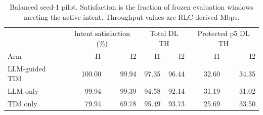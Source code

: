 \begin{table}[t]
\centering
\caption{Balanced seed-1 pilot. Satisfaction is the fraction of frozen evaluation windows meeting the active intent. Throughput values are RLC-derived Mbps.}
\label{tab:pilot-performance}
\begin{tabular}{lrrrrrr}
\toprule
& \multicolumn{2}{c}{Intent satisfaction (\%)} & \multicolumn{2}{c}{Total DL TH} & \multicolumn{2}{c}{Protected p5 DL TH}\\
Arm & I1 & I2 & I1 & I2 & I1 & I2\\
\midrule
LLM-guided TD3 & 100.00 & 99.94 & 97.35 & 96.44 & 32.60 & 34.35 \\
LLM only & 99.94 & 99.39 & 94.58 & 92.14 & 31.19 & 31.02 \\
TD3 only & 79.94 & 69.78 & 95.49 & 93.73 & 25.69 & 33.50 \\
\bottomrule
\end{tabular}
\end{table}
